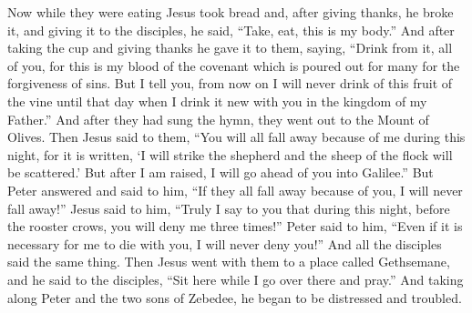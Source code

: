 \begin{biblechapter}
 Now while they were eating Jesus took bread and, after giving thanks, he broke it, and giving it to the disciples, he said, “Take, eat, this is my body.”
\verse And after taking the cup and giving thanks he gave it to them, saying, “Drink from it, all of you,
\verse for this is my blood of the covenant which is poured out for many for the forgiveness of sins.
\verse But I tell you, from now on I will never drink of this fruit of the vine until that day when I drink it new with you in the kingdom of my Father.”
\verse And after they had sung the hymn, they went out to the Mount of Olives.
 Then Jesus said to them, “You will all fall away because of me during this night, for it is written, ‘I will strike the shepherd 
and the sheep of the flock will be scattered.’
\verse But after I am raised, I will go ahead of you into Galilee.”
\verse But Peter answered and said to him, “If they all fall away because of you, I will never fall away!”
\verse Jesus said to him, “Truly I say to you that during this night, before the rooster crows, you will deny me three times!”
\verse Peter said to him, “Even if it is necessary for me to die with you, I will never deny you!” And all the disciples said the same thing.
 Then Jesus went with them to a place called Gethsemane, and he said to the disciples, “Sit here while I go over there and pray.”
\verse And taking along Peter and the two sons of Zebedee, he began to be distressed and troubled.

\end{biblechapter}
